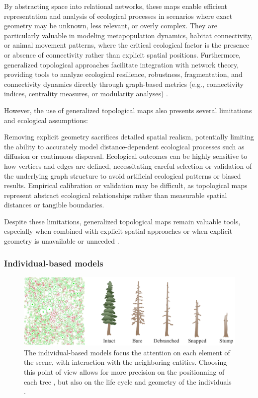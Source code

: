 By abstracting space into relational networks, these maps enable efficient representation and analysis of ecological processes in scenarios where exact geometry may be unknown, less relevant, or overly complex. They are particularly valuable in modeling metapopulation dynamics, habitat connectivity, or animal movement patterns, where the critical ecological factor is the presence or absence of connectivity rather than explicit spatial positions. Furthermore, generalized topological approaches facilitate integration with network theory, providing tools to analyze ecological resilience, robustness, fragmentation, and connectivity dynamics directly through graph-based metrics (e.g., connectivity indices, centrality measures, or modularity analyses) \cite{Lemiere2023,Gaucherel2012}.

However, the use of generalized topological maps also presents several limitations and ecological assumptions:
\begin{Itemize}
    \Item{} Removing explicit geometry sacrifices detailed spatial realism, potentially limiting the ability to accurately model distance-dependent ecological processes such as diffusion or continuous dispersal.
    \Item{} Ecological outcomes can be highly sensitive to how vertices and edges are defined, necessitating careful selection or validation of the underlying graph structure to avoid artificial ecological patterns or biased results.
    \Item{} Empirical calibration or validation may be difficult, as topological maps represent abstract ecological relationships rather than measurable spatial distances or tangible boundaries.
\end{Itemize}

Despite these limitations, generalized topological maps remain valuable tools, especially when combined with explicit spatial approaches \cite{Ecormier-Nocca2021} or when explicit geometry is unavailable or unneeded \cite{Duflot2018,Boussange2022}. 

\subsubsection{Individual-based models}

\begin{figure}[H]
    \centering
    \includegraphics[width= .8 \linewidth]{individual-based-modeling-teaser.png}
    \caption{The individual-based models focus the attention on each element of the scene, with interaction with the neighboring entities. Choosing this point of view allows for more precision on the positionning of each tree \cite{Alsweis2006}, but also on the life cycle and geometry of the individuals \cite{Peytavie2024a}. }
    \label{fig:env-obj_individual-based-models}    
\end{figure}


